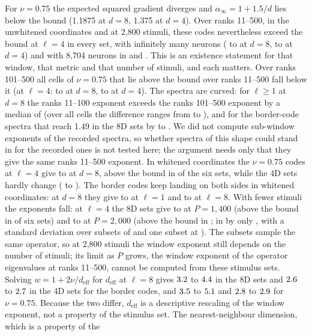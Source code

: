 For $\nu = 0.75$ the expected squared gradient diverges and $\alpha_\infty = 1 + 1.5/d$ lies below the bound (1.1875 at $d = 8$, 1.375 at $d = 4$). Over ranks 11--500, in the unwhitened coordinates and at 2,800 stimuli, these codes nevertheless exceed the bound at $\ell = 4$ in every set, with infinitely many neurons (\WinMidEightLFourMin{} to \WinMidEightLFourMax{} at $d = 8$, \WinMidFourLFourMin{} to \WinMidFourLFourMax{} at $d = 4$) and with 8,704 neurons in \FinMidAbovePhraseEight{} and \FinMidAbovePhraseFour{}. This is an existence statement for that window, that metric and that number of stimuli, and each matters. Over ranks 101--500 all \SubMidAboveCount{} cells of $\nu = 0.75$ that lie above the bound over ranks 11--500 fall below it (at $\ell = 4$: \SubMidEightLFourMin{} to \SubMidEightLFourMax{} at $d = 8$, \SubMidFourLFourMin{} to \SubMidFourLFourMax{} at $d = 4$). The spectra are curved: for $\ell \ge 1$ at $d = 8$ the ranks 11--100 exponent exceeds the ranks 101--500 exponent by a median of \CurvMedEight{} (over all cells the difference ranges from \CurvMin{} to \CurvMax{}), and for the \CurvBorderReachN{} border-code spectra that reach 1.49 in the 8D sets by \CurvBorderReachMin{} to \CurvBorderReachMax{}. We did not compute sub-window exponents of the recorded spectra, so whether spectra of this shape could stand in for the recorded ones is not tested here; the argument needs only that they give the same ranks 11--500 exponent. In whitened coordinates the $\nu = 0.75$ codes at $\ell = 4$ give \WhiteMidEightLFourMin{} to \WhiteMidEightLFourMax{} at $d = 8$, above the bound in \WhiteMidAboveEightWord{} of the six sets, while the 4D sets hardly change (\WhiteMidFourLFourMin{} to \WhiteMidFourLFourMax{}). The border codes keep landing on both sides in whitened coordinates: at $d = 8$ they give \WhiteBorderEightLOneMin{} to \WhiteBorderEightLOneMax{} at $\ell = 1$ and \WhiteBorderEightLEightMin{} to \WhiteBorderEightLEightMax{} at $\ell = 8$. With fewer stimuli the exponents fall: at $\ell = 4$ the 8D sets give \SubPOneThousandFourHundredMidEightLFourMin{} to \SubPOneThousandFourHundredMidEightLFourMax{} at $P = 1{,}400$ (above the bound in \SubPOneThousandFourHundredMidAboveEight{} of six sets) and \SubPTwoThousandMidEightLFourMin{} to \SubPTwoThousandMidEightLFourMax{} at $P = 2{,}000$ (above the bound in \SubPTwoThousandMidAboveEight{}; in \SubPTwoThousandMarginSet{} by only \SubPTwoThousandMarginMin{}, with a standard deviation over subsets of \SubPTwoThousandMarginSD{} and one subset at \SubPTwoThousandMarginSubMin{}). The subsets sample the same operator, so at 2,800 stimuli the window exponent still depends on the number of stimuli; its limit as $P$ grows, the window exponent of the operator eigenvalues at ranks 11--500, cannot be computed from these stimulus sets. Solving $w = 1 + 2\nu/d_{\mathrm{eff}}$ for $d_{\mathrm{eff}}$ at $\ell = 8$ gives $3.2$ to $4.4$ in the 8D sets and $2.6$ to $2.7$ in the 4D sets for the border codes, and $3.5$ to $5.1$ and $2.8$ to $2.9$ for $\nu = 0.75$. Because the two differ, $d_{\mathrm{eff}}$ is a descriptive rescaling of the window exponent, not a property of the stimulus set. The nearest-neighbour dimension, which is a property of the 